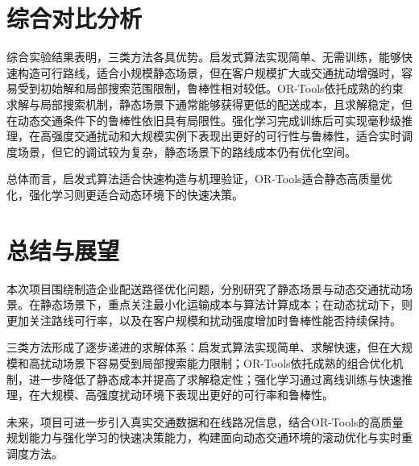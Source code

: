\documentclass[12pt,a4paper,UTF8]{article}
\begin{document}
\section{综合对比分析}

综合实验结果表明，三类方法各具优势。启发式算法实现简单、无需训练，能够快速构造可行路线，适合小规模静态场景，但在客户规模扩大或交通扰动增强时，容易受到初始解和局部搜索范围限制，鲁棒性相对较低。OR-Tools依托成熟的约束求解与局部搜索机制，静态场景下通常能够获得更低的配送成本，且求解稳定，但在动态交通条件下的鲁棒性依旧具有局限性。强化学习完成训练后可实现毫秒级推理，在高强度交通扰动和大规模实例下表现出更好的可行性与鲁棒性，适合实时调度场景，但它的调试较为复杂，静态场景下的路线成本仍有优化空间。

总体而言，启发式算法适合快速构造与机理验证，OR-Tools适合静态高质量优化，强化学习则更适合动态环境下的快速决策。

\section{总结与展望}

本次项目围绕制造企业配送路径优化问题，分别研究了静态场景与动态交通扰动场景。在静态场景下，重点关注最小化运输成本与算法计算成本；在动态扰动下，则更加关注路线可行率，以及在客户规模和扰动强度增加时鲁棒性能否持续保持。

三类方法形成了逐步递进的求解体系：启发式算法实现简单、求解快速，但在大规模和高扰动场景下容易受到局部搜索能力限制；OR-Tools依托成熟的组合优化机制，进一步降低了静态成本并提高了求解稳定性；强化学习通过离线训练与快速推理，在大规模、高强度扰动环境下表现出更好的可行率和鲁棒性。

未来，项目可进一步引入真实交通数据和在线路况信息，结合OR-Tools的高质量规划能力与强化学习的快速决策能力，构建面向动态交通环境的滚动优化与实时重调度方法。

\end{document}
